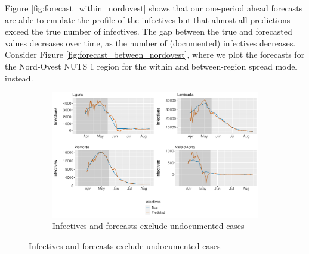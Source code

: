 \documentclass[12pt]{article}
\begin{document}
	Figure \ref{fig:forecast_within_nordovest} shows that our one-period ahead forecasts are able to emulate the profile of the infectives but that almost all predictions exceed the true number of infectives. The gap between the true and forecasted values decreases over time, as the number of (documented) infectives decreases.
	\\
	
    Consider Figure \ref{fig:forecast_between_nordovest}, where we plot the forecasts for the Nord-Ovest NUTS 1 region for the within and between-region spread model instead.
	
	\begin{figure}[H]
	    \centering
	    \begin{subfigure}{\textwidth}
	      \centering
	      \includegraphics[width=0.94\linewidth]{output/model_between_lag14_forecast_start20_Nord-Ovest_rolling.pdf}
	      \caption{Infectives and forecasts exclude undocumented cases}
	      \label{fig:forecast_between_nordovest_regular}
	    \end{subfigure}
    \end{figure}
\end{document}
